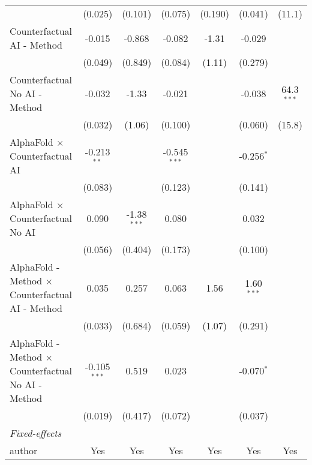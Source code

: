 \begin{tabular}{lcccccc}
                                                              & (0.025)        & (0.101)       & (0.075)        & (0.190)     & (0.041)       & (11.1)\\   
   Counterfactual AI - Method                                 & -0.015         & -0.868        & -0.082         & -1.31       & -0.029        &   \\   
                                                              & (0.049)        & (0.849)       & (0.084)        & (1.11)      & (0.279)       &   \\   
   Counterfactual No AI - Method                              & -0.032         & -1.33         & -0.021         &             & -0.038        & 64.3$^{***}$\\   
                                                              & (0.032)        & (1.06)        & (0.100)        &             & (0.060)       & (15.8)\\   
   AlphaFold $\times$ Counterfactual AI                       & -0.213$^{**}$  &               & -0.545$^{***}$ &             & -0.256$^{*}$  &   \\   
                                                              & (0.083)        &               & (0.123)        &             & (0.141)       &   \\   
   AlphaFold $\times$ Counterfactual No AI                    & 0.090          & -1.38$^{***}$ & 0.080          &             & 0.032         &   \\   
                                                              & (0.056)        & (0.404)       & (0.173)        &             & (0.100)       &   \\   
   AlphaFold - Method $\times$ Counterfactual AI - Method     & 0.035          & 0.257         & 0.063          & 1.56        & 1.60$^{***}$  &   \\   
                                                              & (0.033)        & (0.684)       & (0.059)        & (1.07)      & (0.291)       &   \\   
   AlphaFold - Method $\times$ Counterfactual No AI - Method  & -0.105$^{***}$ & 0.519         & 0.023          &             & -0.070$^{*}$  &   \\   
                                                              & (0.019)        & (0.417)       & (0.072)        &             & (0.037)       &   \\   
   \midrule
   \emph{Fixed-effects}\\
   author                                                     & Yes            & Yes           & Yes            & Yes         & Yes           & Yes\\  

\end{tabular}
